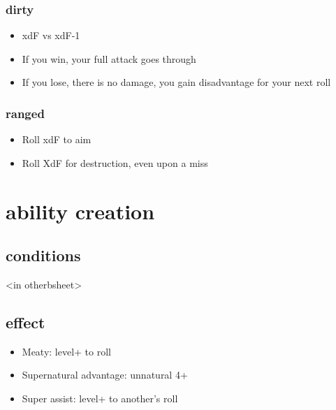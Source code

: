 \documentclass[10pt,letterpaper]{article}
\begin{document}
	\subsubsection{dirty}
	\begin{itemize}
		\item  xdF vs xdF-1
		\item  If you win, your full attack goes through
		\item  If you lose, there is no damage, you gain disadvantage for your next roll
	\end{itemize}
	\subsubsection{ranged}
	\begin{itemize}
		\item  Roll xdF to aim
		\item  Roll XdF for destruction, even upon a miss
	\end{itemize}
	\section{ability creation}
	\subsection{conditions}
	<in otherbsheet>
	
	
	\subsection{effect}
	\begin{itemize}
		\item  Meaty: level+ to roll
		\item  Supernatural advantage: unnatural 4+
		\item  Super assist: level+ to another's roll
	\end{itemize}
	
	
	
\end{document}
